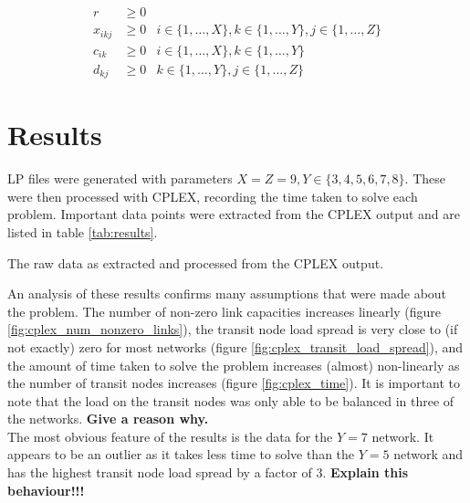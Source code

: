 \documentclass[12pt]{article} %
\begin{document}
\begin{align}
\label{eq:obj_function_nn}
r &\geq 0 \\[1em]
\label{eq:decision_var_nn}
x_{ikj} &\geq 0 & i \in \{1, \ldots, X\}, k \in \{1, \ldots, Y\}, j \in \{1, \ldots, Z\} \\[1em]
\label{eq:source_capacity_nn}
c_{ik} &\geq 0 & i \in \{1, \ldots, X\}, k \in \{1, \ldots, Y\} \\[1em]
\label{eq:dest_capacity_nn}
d_{kj} &\geq 0 & k \in \{1, \ldots, Y\}, j \in \{1, \ldots, Z\}
\end{align}

\section{Results}

LP files were generated with parameters $X = Z = 9, Y \in \{3, 4, 5, 6, 7, 8\}$. These were then processed with CPLEX, recording the time taken to solve each problem. Important data points were extracted from the CPLEX output and are listed in table \ref{tab:results}.

\begin{table}[H]
	\centering
	\caption{The raw data as extracted and processed from the CPLEX output.}
	\label{tab:results}
\end{table}

\noindent An analysis of these results confirms many assumptions that were made about the problem. The number of non-zero link capacities increases linearly (figure \ref{fig:cplex_num_nonzero_links}), the transit node load spread is very close to (if not exactly) zero for most networks (figure \ref{fig:cplex_transit_load_spread}), and the amount of time taken to solve the problem increases (almost) non-linearly as the number of transit nodes increases (figure \ref{fig:cplex_time}). It is important to note that the load on the transit nodes was only able to be balanced in three of the networks. \textbf{Give a reason why.} \\

\noindent The most obvious feature of the results is the data for the $Y=7$ network. It appears to be an outlier as it takes less time to solve than the $Y=5$ network and has the highest transit node load spread by a factor of 3. \textbf{Explain this behaviour!!!} \\
\end{document}
